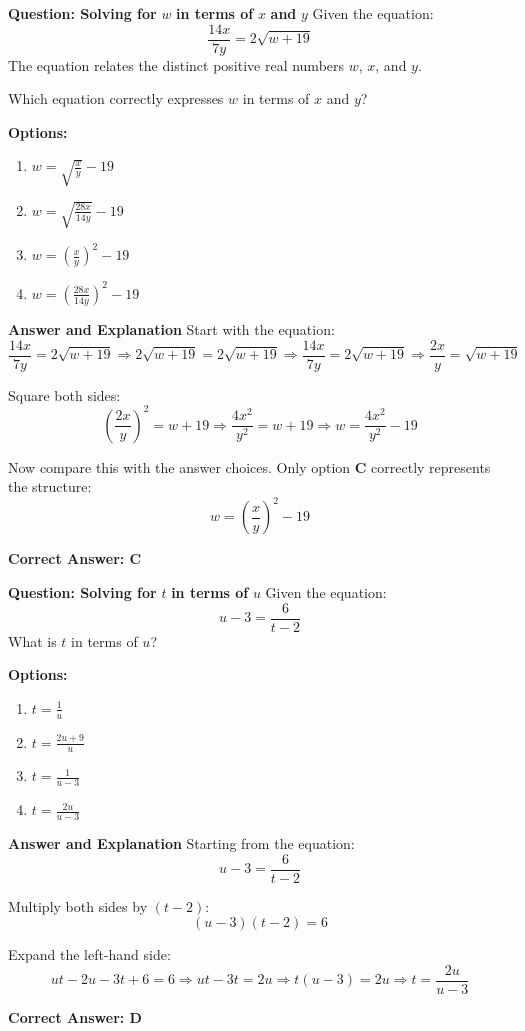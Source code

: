 \documentclass{beamer}
\begin{document}
\begin{frame}{\textbf{Question: Solving for } $w$ \textbf{ in terms of } $x$ \textbf{ and } $y$}
Given the equation:
\[
\frac{14x}{7y} = 2\sqrt{w + 19}
\]
The equation relates the distinct positive real numbers $w$, $x$, and $y$.

Which equation correctly expresses $w$ in terms of $x$ and $y$?

\textbf{Options:}
\begin{enumerate}
    \item[A.] $w = \sqrt{\frac{x}{y}} - 19$
    \item[B.] $w = \sqrt{\frac{28x}{14y}} - 19$
    \item[C.] $w = \left(\frac{x}{y}\right)^2 - 19$
    \item[D.] $w = \left(\frac{28x}{14y}\right)^2 - 19$
\end{enumerate}
\end{frame}

\begin{frame}{\textbf{Answer and Explanation}}
Start with the equation:
\[
\frac{14x}{7y} = 2\sqrt{w + 19}
\Rightarrow 2\sqrt{w + 19} = 2\sqrt{w + 19}
\Rightarrow \frac{14x}{7y} = 2\sqrt{w + 19}
\Rightarrow \frac{2x}{y} = \sqrt{w + 19}
\]

Square both sides:
\[
\left(\frac{2x}{y}\right)^2 = w + 19
\Rightarrow \frac{4x^2}{y^2} = w + 19
\Rightarrow w = \frac{4x^2}{y^2} - 19
\]

Now compare this with the answer choices. Only option \textbf{C} correctly represents the structure:
\[
w = \left(\frac{x}{y}\right)^2 - 19
\]

\textbf{Correct Answer: C}
\end{frame}


\begin{frame}{\textbf{Question: Solving for } $t$ \textbf{ in terms of } $u$}
Given the equation:
\[
u - 3 = \frac{6}{t - 2}
\]
What is $t$ in terms of $u$?

\textbf{Options:}
\begin{enumerate}
    \item[A.] $t = \frac{1}{u}$
    \item[B.] $t = \frac{2u + 9}{u}$
    \item[C.] $t = \frac{1}{u - 3}$
    \item[D.] $t = \frac{2u}{u - 3}$
\end{enumerate}
\end{frame}

\begin{frame}{\textbf{Answer and Explanation}}
Starting from the equation:
\[
u - 3 = \frac{6}{t - 2}
\]

Multiply both sides by $(t - 2)$:
\[
(u - 3)(t - 2) = 6
\]

Expand the left-hand side:
\[
ut - 2u - 3t + 6 = 6
\Rightarrow ut - 3t = 2u
\Rightarrow t(u - 3) = 2u
\Rightarrow t = \frac{2u}{u - 3}
\]

\textbf{Correct Answer: D}
\end{frame}
\end{document}
